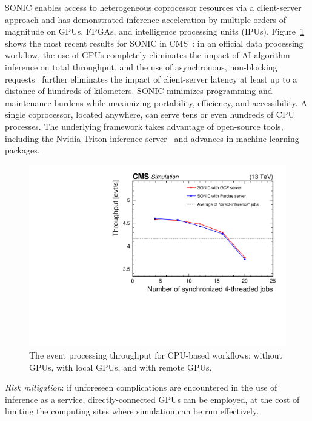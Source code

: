 SONIC enables access to heterogeneous coprocessor resources via a client-server approach
and has demonstrated inference acceleration by multiple orders of magnitude on GPUs, FPGAs, and intelligence processing units (IPUs).
Figure~\ref{fig:sonic} shows the most recent results for SONIC in CMS~\cite{CMS:2024twn}:
in an official data processing workflow, the use of GPUs completely eliminates the impact of AI algorithm inference on total throughput,
and the use of asynchronous, non-blocking requests~\cite{Bocci:2020olh} further eliminates the impact of client-server latency at least up to a distance of hundreds of kilometers.
SONIC minimizes programming and maintenance burdens while maximizing portability, efficiency, and accessibility.
A single coprocessor, located anywhere, can serve tens or even hundreds of CPU processes.
The underlying framework takes advantage of open-source tools, including the Nvidia Triton inference server~\cite{nvidia} and advances in machine learning packages.

\begin{figure}
\centering
\includegraphics[width=0.49\myfigurewidth]{figures/MLG-23-001_Figure_009.pdf}
\caption{The event processing throughput for CPU-based workflows: without GPUs, with local GPUs, and with remote GPUs.}
\label{fig:sonic}
\end{figure}

\textit{Risk mitigation}: if unforeseen complications are encountered in the use of inference as a service,
directly-connected GPUs can be employed, at the cost of limiting the computing sites where simulation can be run effectively.

